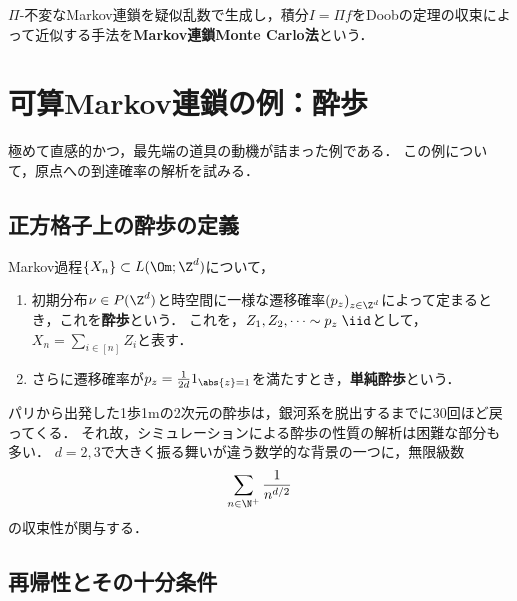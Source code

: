 \documentclass[uplatex,dvipdfmx]{jsreport}
\begin{document}
\begin{remarks}[MCMC]
    $\Pi$-不変なMarkov連鎖を疑似乱数で生成し，積分$I=\Pi f$をDoobの定理の収束によって近似する手法を\textbf{Markov連鎖Monte Carlo法}という．
\end{remarks}

\section{可算Markov連鎖の例：酔歩}

\begin{tcolorbox}[colframe=ForestGreen, colback=ForestGreen!10!white,breakable,colbacktitle=ForestGreen!40!white,coltitle=black,fonttitle=\bfseries\sffamily,
title=]
    極めて直感的かつ，最先端の道具の動機が詰まった例である\cite{Popov21-RandomWalk}．
    この例について，原点への到達確率の解析を試みる．
\end{tcolorbox}

\subsection{正方格子上の酔歩の定義}

\begin{definition}
    Markov過程$\{X_n\}\subset L(\Om;\Z^d)$について，
    \begin{enumerate}
        \item 初期分布$\nu\in P(\Z^d)$と時空間に一様な遷移確率$(p_z)_{z\in\Z^d}$によって定まるとき，これを\textbf{酔歩}という．
        これを，$Z_1,Z_2,\cdots\sim p_z\;\iid$として，$X_n=\sum_{i\in[n]}Z_i$と表す．
        \item さらに遷移確率が$p_z=\frac{1}{2d}1_{\abs{z}=1}$を満たすとき，\textbf{単純酔歩}という．
    \end{enumerate}
\end{definition}
\begin{remarks}[単純酔歩という対象]
    パリから出発した1歩1mの2次元の酔歩は，銀河系を脱出するまでに30回ほど戻ってくる．
    それ故，シミュレーションによる酔歩の性質の解析は困難な部分も多い．
    $d=2,3$で大きく振る舞いが違う数学的な背景の一つに，無限級数
    \[\sum_{n\in\N^+}\frac{1}{n^{d/2}}\]
    の収束性が関与する．
\end{remarks}

\subsection{再帰性とその十分条件}
\end{document}
